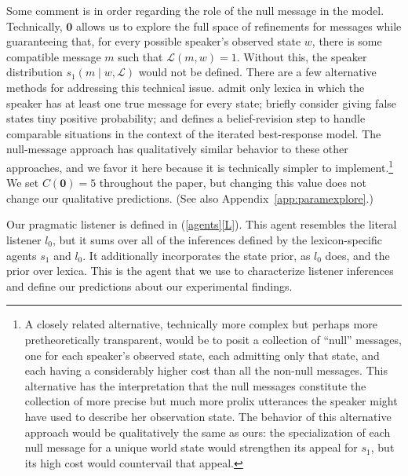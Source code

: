 \documentclass[leqno,12pt]{article}
\newcommand{\Appendixref}[1]{Appendix~\ref{#1}}
\newcommand{\subeg}[2]{(\ref{#1}\ref{#2})}
\newcommand{\given}{\mid}
\newcommand{\state}{w}
\newcommand{\Lex}{\mathcal{L}}
\newcommand{\msg}{m}
\newcommand{\Costs}{C}
\newcommand{\listenerZero}{l_{0}}
\newcommand{\speakerOne}{s_{1}}
\newcommand{\nullmsg}{\mathbf{0}}
\begin{document}
{Some comment is in order regarding the role of the null message in the
model.  Technically, $\nullmsg$ allows us to explore the full space of
refinements for messages while guaranteeing that, for every possible
speaker's observed state $\state$, there is some compatible message
$\msg$ such that $\Lex(\msg, w) = 1$.  Without this, the speaker
distribution $\speakerOne(\msg \given \state, \Lex)$ would not be
defined.  There are a few alternative methods for addressing this
technical issue. \citet{Bergen:Goodman:Levy:2012} admit only lexica in
which the speaker has at least one true message for every state;
\citet{Bergen:Levy:Goodman:2014} briefly consider giving false states
tiny positive probability; and \citet{Jaeger:2011} defines a
belief-revision step to handle comparable situations in the context of
the iterated best-response model. The null-message approach has
qualitatively similar behavior to these other approaches, and we favor
it here because it is technically simpler to implement.\footnote{A
  closely related alternative, technically more complex but perhaps
  more pretheoretically transparent, would be to posit a collection of
  ``null'' messages, one for each speaker's observed state, each
  admitting only that state, and each having a considerably higher
  cost than all the non-null messages. This alternative has the
  interpretation that the null messages constitute the collection of
  more precise but much more prolix utterances the speaker might have
  used to describe her observation state.  The behavior of this
  alternative approach would be qualitatively the same as ours: the
  specialization of each null message for a unique world state would
  strengthen its appeal for $\speakerOne$, but its high cost would
  countervail that appeal.}  We set $\Costs(\nullmsg) = 5$ throughout
the paper, but changing this value does not change our qualitative
predictions.  (See also \Appendixref{app:paramexplore}.)

Our pragmatic listener is defined in \subeg{agents}{L}. This agent
resembles the literal listener $\listenerZero$, but it sums over all
of the inferences defined by the lexicon-specific agents $\speakerOne$
and $\listenerZero$. It additionally incorporates the state prior, as
$\listenerZero$ does, and the prior over lexica.  This is the agent
that we use to characterize listener inferences and define our
predictions about our experimental findings.

}
\end{document}
